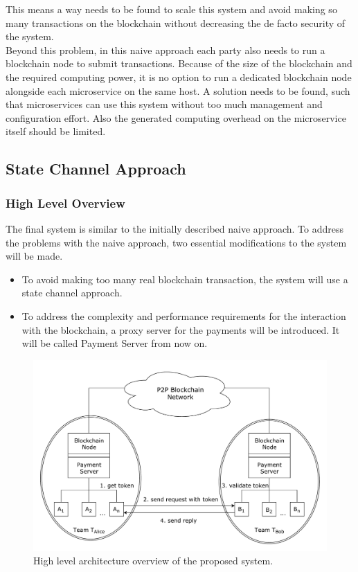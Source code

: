 \documentclass[a4paper,12pt]{scrartcl}
\begin{document}
This means a way needs to be found to scale this system and avoid making so many transactions on the blockchain without decreasing the de facto security of the system.\\

Beyond this problem, in this naive approach each party also needs to run a blockchain node to submit transactions. Because of the size of the blockchain and the required computing power, it is no option to run a dedicated blockchain node alongside each microservice on the same host. A solution needs to be found, such that microservices can use this system without too much management and configuration effort. Also the generated computing overhead on the microservice itself should be limited.\\


\subsection{State Channel Approach}

\subsubsection{High Level Overview}

The final system is similar to the initially described naive approach. To address the problems with the naive approach, two essential modifications to the system will be made.

\begin{itemize}
\item To avoid making too many real blockchain transaction, the system will use a state channel approach.
\item To address the complexity and performance requirements for the interaction with the blockchain, a proxy server for the payments will be introduced. It will be called Payment Server from now on.
\end{itemize}

\begin{figure}[H]
\centering
\includegraphics[width=450pt]{Images/HighLevelOverview.pdf}
\caption{High level architecture overview of the proposed system.}
\label{fig:HighLevelOverview}
\end{figure}
\end{document}
